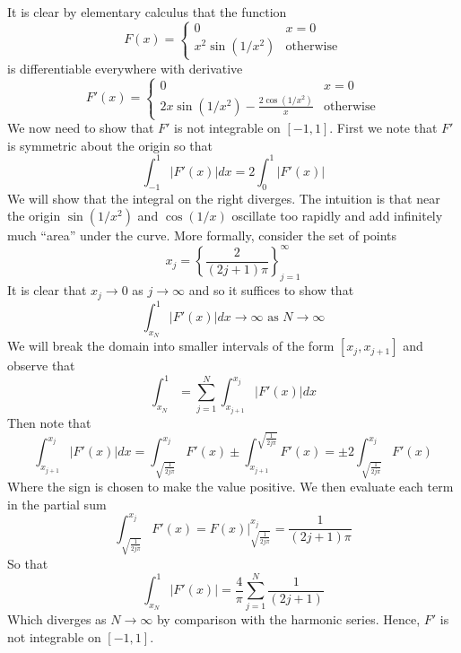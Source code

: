 \documentclass{article}
\newcommand{\problem}[1]{\noindent{\textbf{Problem #1}}\\}
\begin{document}
\problem{3.5.12}
It is clear by elementary calculus that the function
\[
F(x) = \begin{cases}
0                       & x = 0 \\ 
x^2\sin(1/x^2) & \text{otherwise}
\end{cases}
\]                                                                                                                                                                                                                                                                                                                                                                                                                                                                                                                                                                                                              
is differentiable everywhere with derivative
\[
F'(x) = \begin{cases}
0                                                          & x = 0 \\
2x\sin(1/x^2) - \frac{2\cos(1/x^2)}{x} & \text{otherwise}
\end{cases}
\]
We now need to show that $F'$ is not integrable on $[-1,1]$. First we note that $F'$ is symmetric about the origin so that 
\[
\int_{-1}^1 |F'(x)|dx = 2\int_{0}^1 |F'(x)|
\]
We will show that the integral on the right diverges. The intuition is that near the origin $\sin(1/x^2)$ and $\cos(1/x)$ oscillate too rapidly and add infinitely much ``area'' under the curve. More formally, consider the set of points 
\[
x_j = \left\{\frac{2}{(2j+1)\pi}\right\}_{j=1}^\infty
\]
It is clear that $x_j \to 0$ as $j \to \infty$ and so it suffices to show that
\[
\int_{x_N}^1 |F'(x)|dx \to \infty \text{ as } N\to\infty
\]
We will break the domain into smaller intervals of the form $[x_j,x_{j+1}]$ and observe that
\[
\int_{x_N}^1 = \sum_{j=1}^N \int_{x_{j+1}}^{x_{j}} |F'(x)|dx
\]
Then note that
\[
\int_{x_{j+1}}^{x_{j}} |F'(x)|dx = \int_{\sqrt{\frac{1}{2j\pi}}}^{x_j} F'(x) \pm \int_{x_{j+1}}^{\sqrt{\frac{1}{2j\pi}}} F'(x) = \pm 2\int_{\sqrt{\frac{1}{2j\pi}}}^{x_j} F'(x) 
\]
Where the sign is chosen to make the value positive. We then evaluate each term in the partial sum
\[
\int_{\sqrt{\frac{1}{2j\pi}}}^{x_j} F'(x) = F(x) \Big |_{\sqrt{\frac{1}{2j\pi}}}^{x_j} = \frac{1}{(2j+1)\pi} 
\]
So that 
\[
\int_{x_N}^1 |F'(x)| = \frac{4}{\pi} \sum_{j=1}^N \frac{1}{(2j+1)}
\]
Which diverges as $N \to \infty$ by comparison with the harmonic series. Hence, $F'$ is not integrable on $[-1,1]$.
\end{document}
